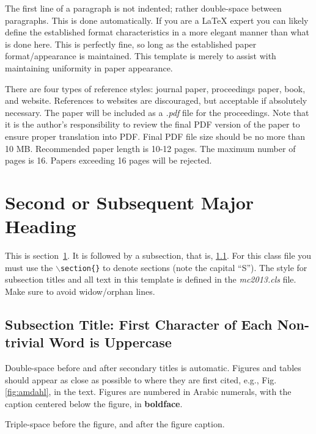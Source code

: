 \documentclass{ansconf}
\begin{document}
The first line of a paragraph is not indented; rather double-space between
paragraphs.  This is done automatically. If you are a {\LaTeX} expert you
can likely define the established format characteristics in a more elegant
manner than what is done here.  This is perfectly fine, so long as the
established paper format/appearance is maintained.  This template is merely
to assist with maintaining uniformity in paper appearance.

There are four types of reference styles: journal paper\cite{journal},
proceedings paper\cite{proc_paper}, book\cite{book}, and website\cite{techrep}.
References to websites are discouraged, but acceptable if absolutely necessary.
The paper will be included as a {\it .pdf} file for the proceedings. Note that
it is the author's responsibility to review the final PDF version of the paper
to ensure proper translation into PDF.  Final PDF file size should be no more
than 10 MB. Recommended paper length is 10-12 pages. The maximum number of pages is 16. Papers exceeding 16 pages will be rejected.

\section{Second or Subsequent Major Heading}
\label{sec:first}

This is section~\ref{sec:first}. It is followed by a subsection, that is,
\ref{sec:second}. For this class file you must use the
\texttt{$\backslash$section\{\}} to denote sections (note the capital ``S'').
The style for subsection titles and all text in this template is defined in
the {\it mc2013.cls} file.  Make sure to avoid widow/orphan lines.


\subsection{Subsection Title: First Character of Each Non-trivial Word is
Uppercase}
\label{sec:second}

Double-space before and after secondary titles is automatic.  Figures and
tables should appear as close as possible to where they are first
cited, e.g., Fig. \ref{fig:amdahl}, in the text.  Figures are numbered in
Arabic numerals, with the caption centered below the figure, in
{\bf boldface}.

Triple-space before the figure, and after the figure caption.
\end{document}

